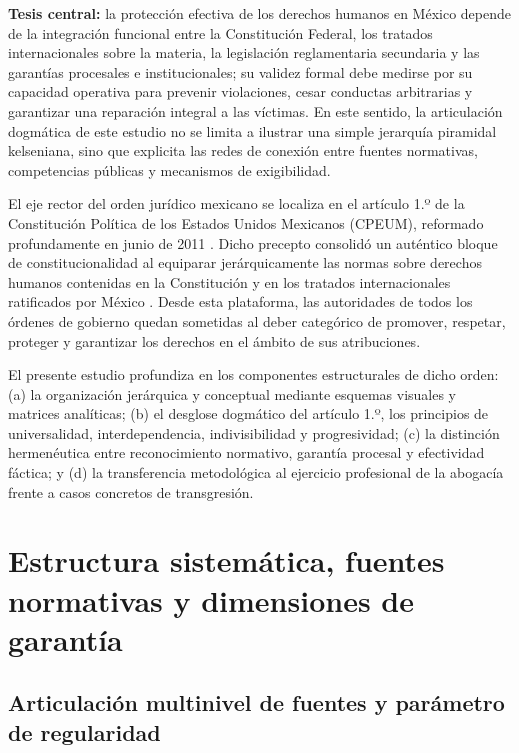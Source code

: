 \documentclass[12pt,spanish,letterpaper,oneside]{article}
\begin{document}
\textbf{Tesis central:} la protecci\'on efectiva de los derechos humanos en M\'exico depende de la integraci\'on funcional entre la Constituci\'on Federal, los tratados internacionales sobre la materia, la legislaci\'on reglamentaria secundaria y las garant\'ias procesales e institucionales; su validez formal debe medirse por su capacidad operativa para prevenir violaciones, cesar conductas arbitrarias y garantizar una reparaci\'on integral a las v\'ictimas. En este sentido, la articulaci\'on dogm\'atica de este estudio no se limita a ilustrar una simple jerarqu\'ia piramidal kelseniana, sino que explicita las redes de conexi\'on entre fuentes normativas, competencias p\'ublicas y mecanismos de exigibilidad.

El eje rector del orden jur\'idico mexicano se localiza en el art\'iculo 1.º de la Constituci\'on Pol\'itica de los Estados Unidos Mexicanos (CPEUM), reformado profundamente en junio de 2011 \citep{carbonellDerechosHumanos2019,cpeumADH2026}. Dicho precepto consolid\'o un aut\'entico bloque de constitucionalidad al equiparar jer\'arquicamente las normas sobre derechos humanos contenidas en la Constituci\'on y en los tratados internacionales ratificados por M\'exico \citep{scjnParametro2014ADH}. Desde esta plataforma, las autoridades de todos los \'ordenes de gobierno quedan sometidas al deber categ\'orico de promover, respetar, proteger y garantizar los derechos en el \'ambito de sus atribuciones.

El presente estudio profundiza en los componentes estructurales de dicho orden: (a) la organizaci\'on jer\'arquica y conceptual mediante esquemas visuales y matrices anal\'iticas; (b) el desglose dogm\'atico del art\'iculo 1.º, los principios de universalidad, interdependencia, indivisibilidad y progresividad; (c) la distinci\'on hermen\'eutica entre reconocimiento normativo, garant\'ia procesal y efectividad f\'actica; y (d) la transferencia metodol\'ogica al ejercicio profesional de la abogac\'ia frente a casos concretos de transgresi\'on.

\section{Estructura sistem\'atica, fuentes normativas y dimensiones de garant\'ia}

\subsection{Articulaci\'on multinivel de fuentes y par\'ametro de regularidad}
\end{document}

